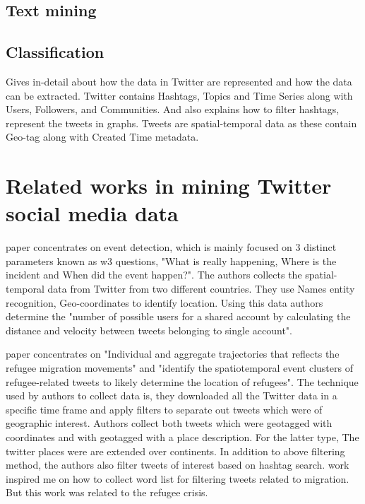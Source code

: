 \subsection{Text mining}
\subsection{Classification}







\cite{Marco} Gives in-detail about how the data in Twitter are represented
and how the data can be extracted. Twitter contains Hashtags, Topics and Time Series along with
Users, Followers, and Communities. And  \cite{Marco} also explains how to filter hashtags, represent the
tweets in graphs. Tweets are spatial-temporal data as these contain Geo-tag along with Created
Time metadata.

\section{Related works in mining Twitter social media data}




\cite{Goergen} paper concentrates on event detection, which is mainly focused on 3 distinct parameters
known as w3 questions, "What is really happening, Where is the incident and When did the
event happen?". The authors collects the spatial-temporal data from Twitter from two different
countries. They use Names entity recognition, Geo-coordinates to identify location. Using this
data authors determine the "number of possible users for a shared account by calculating the
distance and velocity between tweets belonging to single account".

 
\cite{Hübl} paper concentrates on "Individual and aggregate trajectories that reflects the refugee migration
movements" and "identify the spatiotemporal event clusters of refugee-related tweets to
likely determine the location of refugees". The technique used by authors to collect data is, they
downloaded all the Twitter data in a specific time frame and apply filters to separate out tweets
which were of geographic interest. Authors collect both tweets which were geotagged with coordinates
and with geotagged with a place description. For the latter type, The twitter places were
are extended over continents. In addition to above filtering method, the authors also filter tweets
of interest based on hashtag search. \cite{Hübl} work inspired me on how to collect word list for filtering
tweets related to migration. But this work was related to the refugee crisis.
 

